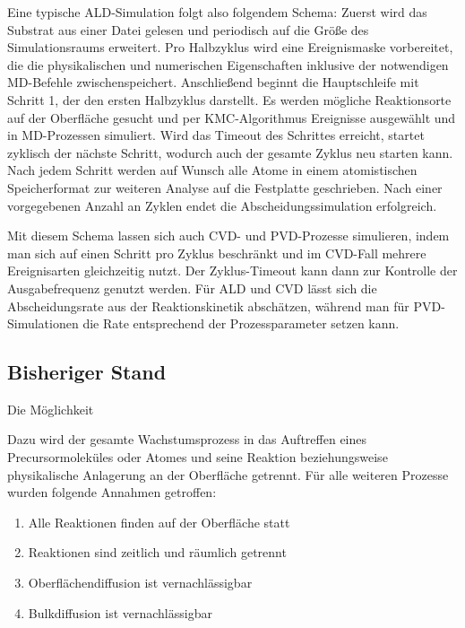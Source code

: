Eine typische ALD-Simulation folgt also folgendem Schema:
Zuerst wird das Substrat aus einer Datei gelesen und periodisch auf die Größe des Simulationsraums erweitert.
Pro Halbzyklus wird eine Ereignismaske vorbereitet, die die physikalischen und numerischen Eigenschaften inklusive der notwendigen MD-Befehle zwischenspeichert.
Anschließend beginnt die Hauptschleife mit Schritt 1, der den ersten Halbzyklus darstellt.
Es werden mögliche Reaktionsorte auf der Oberfläche gesucht und per KMC-Algorithmus Ereignisse ausgewählt und in MD-Prozessen simuliert.
Wird das Timeout des Schrittes erreicht, startet zyklisch der nächste Schritt, wodurch auch der gesamte Zyklus neu starten kann.
Nach jedem Schritt werden auf Wunsch alle Atome in einem atomistischen Speicherformat zur weiteren Analyse auf die Festplatte geschrieben.
Nach einer vorgegebenen Anzahl an Zyklen endet die Abscheidungssimulation erfolgreich.

Mit diesem Schema lassen sich auch CVD- und PVD-Prozesse simulieren, indem man sich auf einen Schritt pro Zyklus beschränkt und im CVD-Fall mehrere Ereignisarten gleichzeitig nutzt.
Der Zyklus-Timeout kann dann zur Kontrolle der Ausgabefrequenz genutzt werden.
Für ALD und CVD lässt sich die Abscheidungsrate aus der Reaktionskinetik abschätzen, während man für PVD-Simulationen die Rate entsprechend der Prozessparameter setzen kann.

\begin{figure}
  \centering
  \def\svgwidth{\textwidth}
  
  \caption[Parsivald-Modi]{
  }
  \label{fig:parsivald-modes}
\end{figure}


\subsection{Bisheriger Stand}

Die Möglichkeit 

Dazu wird der gesamte Wachstumsprozess in das Auftreffen eines Precursormoleküles oder Atomes und seine Reaktion beziehungsweise physikalische Anlagerung an der Oberfläche getrennt.
Für alle weiteren Prozesse wurden folgende Annahmen getroffen:

\begin{enumerate}
\item Alle Reaktionen finden auf der Oberfläche statt
\item Reaktionen sind zeitlich und räumlich getrennt
\item Oberflächendiffusion ist vernachlässigbar
\item Bulkdiffusion ist vernachlässigbar
\end{enumerate}

